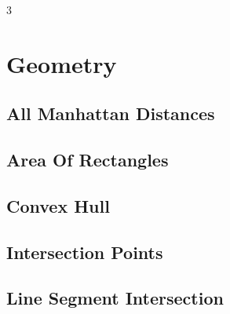 \documentclass[8pt]{extarticle}
\begin{document}
\begin{multicols*}{3}

\section{Geometry}

\subsection{All Manhattan Distances}
\begin{caixaenunciado}

\end{caixaenunciado}
\vspace{0.3cm}


\subsection{Area Of Rectangles}
\begin{caixaenunciado}

\end{caixaenunciado}
\vspace{0.3cm}


\subsection{Convex Hull}
\begin{caixaenunciado}

\end{caixaenunciado}
\vspace{0.3cm}


\subsection{Intersection Points}
\begin{caixaenunciado}

\end{caixaenunciado}
\vspace{0.3cm}


\subsection{Line Segment Intersection}
\begin{caixaenunciado}

\end{caixaenunciado}
\vspace{0.3cm}



\end{multicols*}
\end{document}
